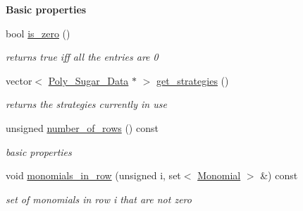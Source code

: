 \begin{Indent}\textbf{ Basic properties}\par
\begin{DoxyCompactItemize}
\item 
\mbox{\label{group___g_b_computation_aee8c1358071a26e60b2e50f9678dcfb0}} 
bool \hyperlink{group___g_b_computation_aee8c1358071a26e60b2e50f9678dcfb0}{is\+\_\+zero} ()
\begin{DoxyCompactList}\small\item\em returns {\ttfamily true} iff all the entries are 0 \end{DoxyCompactList}\item 
\mbox{\label{group___g_b_computation_a1e58764d1bee3437e2bfa74fbb847b1a}} 
vector$<$ \hyperlink{group__strategygroup_class_poly___sugar___data}{Poly\+\_\+\+Sugar\+\_\+\+Data} $\ast$ $>$ \hyperlink{group___g_b_computation_a1e58764d1bee3437e2bfa74fbb847b1a}{get\+\_\+strategies} ()
\begin{DoxyCompactList}\small\item\em returns the strategies currently in use \end{DoxyCompactList}\item 
\mbox{\label{group___g_b_computation_afe2aa558df25088c0b184134deaf0ee2}} 
unsigned \hyperlink{group___g_b_computation_afe2aa558df25088c0b184134deaf0ee2}{number\+\_\+of\+\_\+rows} () const
\begin{DoxyCompactList}\small\item\em basic properties \end{DoxyCompactList}\item 
\mbox{\label{group___g_b_computation_a199285ca97ceba99fced77bb368681e1}} 
void \hyperlink{group___g_b_computation_a199285ca97ceba99fced77bb368681e1}{monomials\+\_\+in\+\_\+row} (unsigned i, set$<$ \hyperlink{group__polygroup_class_monomial}{Monomial} $>$ \&) const
\begin{DoxyCompactList}\small\item\em set of monomials in row {\ttfamily i} that are not zero \end{DoxyCompactList}\item 
\mbox{\label{group___g_b_computation_ad7c37d08523c27bbb1990534abd95461}} 

\end{DoxyCompactItemize}
\end{Indent}

